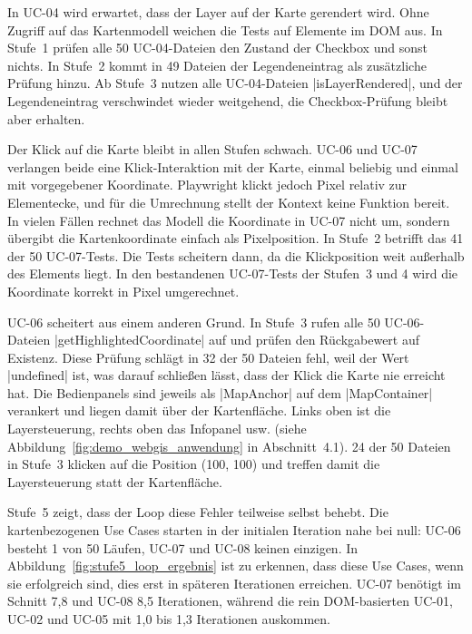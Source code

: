In UC-04 wird erwartet, dass der Layer auf der Karte gerendert wird. Ohne Zugriff auf das Kartenmodell weichen die Tests auf Elemente im \ac{DOM} aus. In Stufe~1 prüfen alle 50 UC-04-Dateien den Zustand der Checkbox und sonst nichts. In Stufe~2 kommt in 49 Dateien der Legendeneintrag als zusätzliche Prüfung hinzu. Ab Stufe~3 nutzen alle UC-04-Dateien \code|isLayerRendered|, und der Legendeneintrag verschwindet wieder weitgehend, die Checkbox-Prüfung bleibt aber erhalten.

Der Klick auf die Karte bleibt in allen Stufen schwach. UC-06 und UC-07 verlangen beide eine Klick-Interaktion mit der Karte, einmal beliebig und einmal mit vorgegebener Koordinate. Playwright klickt jedoch Pixel relativ zur Elementecke, und für die Umrechnung stellt der Kontext keine Funktion bereit. In vielen Fällen rechnet das Modell die Koordinate in UC-07 nicht um, sondern übergibt die Kartenkoordinate einfach als Pixelposition. In Stufe~2 betrifft das 41 der 50 UC-07-Tests. Die Tests scheitern dann, da die Klickposition weit außerhalb des Elements liegt. In den bestandenen UC-07-Tests der Stufen~3 und 4 wird die Koordinate korrekt in Pixel umgerechnet.

UC-06 scheitert aus einem anderen Grund. In Stufe~3 rufen alle 50 UC-06-Dateien \code|getHighlightedCoordinate| auf und prüfen den Rückgabewert auf Existenz. Diese Prüfung schlägt in 32 der 50 Dateien fehl, weil der Wert \code|undefined| ist, was darauf schließen lässt, dass der Klick die Karte nie erreicht hat. Die Bedienpanels sind jeweils als \code|MapAnchor| auf dem \code|MapContainer| verankert und liegen damit über der Kartenfläche. Links oben ist die Layersteuerung, rechts oben das Infopanel usw. (siehe Abbildung~\ref{fig:demo_webgis_anwendung} in Abschnitt~4.1). 24 der 50 Dateien in Stufe~3 klicken auf die Position (100, 100) und treffen damit die Layersteuerung statt der Kartenfläche.

Stufe~5 zeigt, dass der Loop diese Fehler teilweise selbst behebt. Die kartenbezogenen Use Cases starten in der initialen Iteration nahe bei null: UC-06 besteht 1 von 50 Läufen, UC-07 und UC-08 keinen einzigen. In Abbildung~\ref{fig:stufe5_loop_ergebnis} ist zu erkennen, dass diese Use Cases, wenn sie erfolgreich sind, dies erst in späteren Iterationen erreichen. UC-07 benötigt im Schnitt 7,8 und UC-08 8,5 Iterationen, während die rein \ac{DOM}-basierten UC-01, UC-02 und UC-05 mit 1,0 bis 1,3 Iterationen auskommen.

